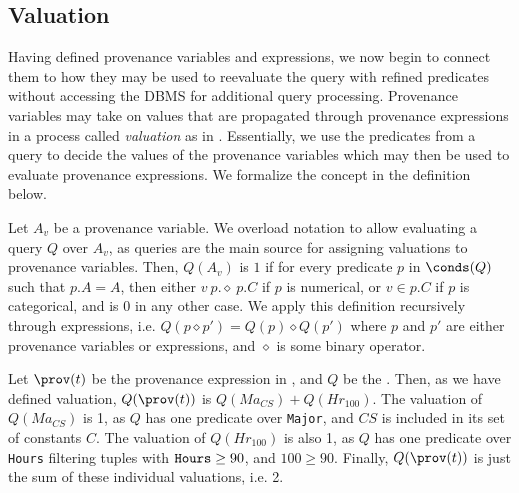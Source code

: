 
\subsection{Valuation}
Having defined provenance variables and expressions, we now begin to connect them to how they may be used to reevaluate the query with refined predicates without accessing the DBMS for additional query processing. Provenance variables may take on values that are propagated through provenance expressions in a process called {\it valuation} as in \cite{MLJ22}. Essentially, we use the predicates from a query to decide the values of the provenance variables which may then be used to evaluate provenance expressions. We formalize the concept in the definition below.
\begin{definition}
    Let $A_v$ be a provenance variable. We overload notation to allow evaluating a query $Q$ over $A_v$, as queries are the main source for assigning valuations to provenance variables. Then, $Q(A_v)$ is $1$ if for every predicate $p$ in $\conds(Q)$ such that $p.A = A$, then either $v\ p.\diamond\ p.C$ if $p$ is numerical, or $v \in p.C$ if $p$ is categorical, and is 0 in any other case. We apply this definition recursively through expressions, i.e. $Q(p \diamond p') = Q(p) \diamond Q(p')$ where $p$ and $p'$ are either provenance variables or expressions, and $\diamond$ is some binary operator.
\end{definition}

\begin{example}
    Let $\prov(t)$ be the provenance expression in , and $Q$ be the \running{}. Then, as we have defined valuation, $Q(\prov(t))$ is $Q(Ma_{CS}) + Q(Hr_{100})$. The valuation of $Q(Ma_{CS})$ is 1, as $Q$ has one predicate over {\tt Major}, and $CS$ is included in its set of constants $C$. The valuation of $Q(Hr_{100})$ is also 1, as $Q$ has one predicate over {\tt Hours} filtering tuples with ${\tt Hours} \geq 90$, and $100 \geq 90$. Finally, $Q(\prov(t))$ is just the sum of these individual valuations, i.e. 2.  
\end{example}

